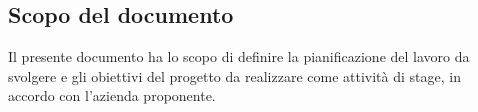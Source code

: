 
\subsection{Scopo del documento}
	Il presente documento ha lo scopo di definire la pianificazione del lavoro da svolgere e gli obiettivi del progetto da realizzare come attività di stage, in accordo con l'azienda proponente.
